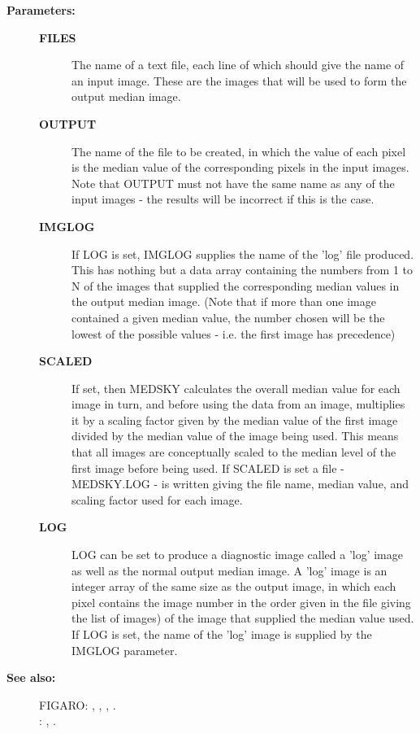 \begin{description}
\begin{description}
\item [\textbf{Parameters:}]
\begin{description}
\item [\textbf{FILES}]
 The name of a text file, each line of which
 should give the name of an input image.  These are the
 images that will be used to form the output median image.
\item [\textbf{OUTPUT}]
 The name of the file to be created, in
 which the value of each pixel is the median value of the
 corresponding pixels in the input images.  Note that
 OUTPUT must not have the same name as any of the input
 images - the results will be incorrect if this is the
 case.
\item [\textbf{IMGLOG}]
 If LOG is set, IMGLOG supplies the name of the 'log'
 file produced.  This has nothing but a data array
 containing the numbers from 1 to N of the images that
 supplied the corresponding median values in the output
 median image.  (Note that if more than one image contained
 a given median value, the number chosen will be the lowest
 of the possible values - i.e. the first image has precedence)
\item [\textbf{SCALED}]
 If set, then MEDSKY calculates the overall median value
 for each image in turn, and before using the data from
 an image, multiplies it by a scaling factor given by the
 median value of the first image divided by the median value
 of the image being used.  This means that all images are
 conceptually scaled to the median level of the first image
 before being used.  If SCALED is set a file - MEDSKY.LOG -
 is written giving the file name, median value, and scaling
 factor used for each image.
\item [\textbf{LOG}]
 LOG can be set to produce a diagnostic image called
 a 'log' image as well as the normal output median image.
 A 'log' image is an integer array of the same size as the
 output image, in which each pixel contains the image number
 in the order given in the file giving the list of images)
 of the image that supplied the median value used. If LOG
 is set, the name of the 'log' image is supplied by the
 IMGLOG parameter.
\end{description}

\item [\textbf{See also:}]
FIGARO: , , , .\\
: , .\\


\end{description}
\end{description}
